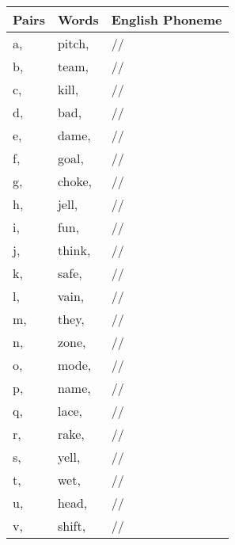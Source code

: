 \documentclass[11pt]{article}
\begin{document}
\begin{solution}
\begin{description}
	\begin{tabular}{l l | l}
	\textbf{Pairs} & \textbf{Words} & \textbf{English Phoneme} \\ \hline
	a,  & pitch,  & /\textipa{}/ \\
	b,  & team,  & /\textipa{}/ \\
	c,  & kill,  & /\textipa{}/ \\
	d,  & bad,  & /\textipa{}/ \\
	e,  & dame,  & /\textipa{}/ \\
	f,  & goal,  & /\textipa{}/ \\
	g,  & choke,  & /\textipa{}/ \\
	h,  & jell,  & /\textipa{}/ \\
	i,  & fun,  & /\textipa{}/ \\
	j,  & think,  & /\textipa{}/ \\
	k,  & safe,  & /\textipa{}/ \\
	l,  & vain,  & /\textipa{}/ \\
	m,  & they,  & /\textipa{}/ \\
	n,  & zone,  & /\textipa{}/ \\
	o,  & mode,  & /\textipa{}/ \\
	p,  & name,  & /\textipa{}/ \\
	q,  & lace,  & /\textipa{}/ \\
	r,  & rake,  & /\textipa{}/ \\
	s,  & yell,  & /\textipa{}/ \\
	t,  & wet,  & /\textipa{}/ \\
	u,  & head,  & /\textipa{}/ \\
	v,  & shift,  & /\textipa{}/ \\
	\hline
	\end{tabular}

\end{description}

\end{solution}
\end{document}
